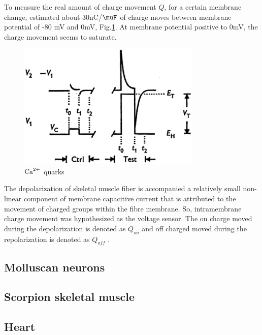 To measure the real amount of charge movement $Q$, for a certain membrane
change, \citep{Adrian1976} estimated about 30nC/$\muF$ of charge moves between membrane
potential of -80 mV and 0mV, Fig.\ref{fig:charge_movement_Adrian1976}. At
membrane potential positive to 0mV, the charge movement seems to saturate.

\begin{figure}[hbt]
  \centerline{\includegraphics[height=6cm,
    angle=0]{./images/charge_movement_Adrian1976.eps}}
  \caption{${\text{Ca}^{2+}}$ quarks}
\label{fig:charge_movement_Adrian1976}
\end{figure}

The depolarization of skeletal muscle fiber is accompanied a relatively small
non-linear component of membrane capacitive current that is attributed to the
movement of charged groups within the fibre membrane. So, intramembrane charge
movement was hypothesized as the voltage sensor. The on charge moved during the
depolarization is denoted as $Q_{on}$ and off charged moved during the
repolarization is denoted as $Q_{off}$ \citep{Melzer1986}.

\subsection{Molluscan neurons}

\citep{adams1979, kostyuk1981}

\subsection{Scorpion skeletal muscle}

\citep{scheuer1986}

\subsection{Heart}



